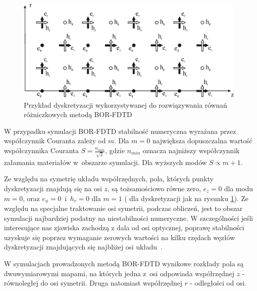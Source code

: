 \begin{figure}
	\includegraphics[width=\textwidth]{subart/fdtd/R5_TFSF.png}
	\caption{Przykład dyskretyzacji wykorzystywanej do rozwiązywania równań różniczkowych metodą BOR-FDTD \cite{antosiewicz2009wplyw}}
	\label{fig:bor-dysk}
\end{figure}
W przypadku symulacji BOR-FDTD stabilność numeryczna wyrażana przez współczynnik Couranta zależy od $m$. Dla $m=0$ największa dopuszczalna wartość współczynnika Couranta $S=\frac{n_{min}}{\sqrt{2}}$, gdzie $n_{min}$ oznacza najniższy współczynnik załamania materiałów w~obszarze symulacji. Dla wyższych modów $S \propto m+1$. 

Ze względu na symetrię układu współrzędnych, pola, których punkty dyskretyzacji znajdują się na osi $z$, są tożsamościowo równe zero, $e_z=0$ dla modu $m=0$, oraz $e_{\phi}=0$~i~$h_r=0$ dla $m=1$ ( dla dyskretyzacji jak na rysunku \ref{fig:bor-dysk}). Ze względu na specjalne traktowanie osi symetrii, podczas obliczeń, jest to obszar symulacji najbardziej podatny na niestabilności numeryczne. W szczególności jeśli interesujące nas zjawiska zachodzą z dala od osi optycznej, poprawę stabilności uzyskuje się poprzez wymaganie zerowych wartości na kilku rzędach węzłów dyskretyzacji znajdujących się najbliżej osi układu~\cite{OskooiRo10}.

W symulacjach prowadzonych metodą BOR-FDTD wynikowe rozkłady pola są dwuwymiarowymi mapami, na których jedna z~osi odpowiada współrzędnej $z$ - równoległej do osi symetrii. Druga natomiast współrzędnej $r$ - odległości od osi. 

